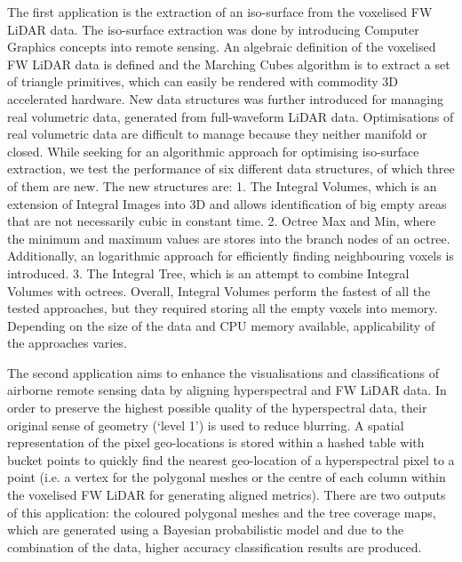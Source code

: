 \documentclass{subfiles}
\begin{document}
\par The first application is the extraction of an iso-surface from the voxelised FW LiDAR data. The iso-surface extraction was done by introducing Computer Graphics concepts into remote sensing. An algebraic definition of the voxelised FW LiDAR data is defined and the Marching Cubes algorithm is to extract a set of triangle primitives, which can easily be rendered with commodity 3D accelerated hardware. New data structures was further introduced for managing real volumetric data, generated from full-waveform LiDAR data. Optimisations of real volumetric data are difficult to manage because they neither manifold or closed. While seeking for an algorithmic approach for optimising iso-surface extraction, we test the performance of six different data structures, of which three of them are new. The new structures are: 1. The Integral Volumes, which is an extension of Integral Images into 3D and allows identification of big empty areas that are not necessarily cubic in constant time. 2. Octree Max and Min, where the minimum and maximum values are stores into the branch nodes of an octree. Additionally, an logarithmic approach for efficiently finding neighbouring voxels is introduced. 3. The Integral Tree, which is an attempt to combine Integral Volumes with octrees. Overall, Integral Volumes perform the fastest of all the tested approaches, but they required storing all the empty voxels into memory. Depending on the size of the data and CPU memory available, applicability of the approaches varies. 

\par The second application aims to enhance the visualisations and classifications of airborne remote sensing data by aligning hyperspectral and FW LiDAR data.  In order to preserve the highest possible quality of the hyperspectral data, their original sense of geometry (`level 1') is used to reduce blurring. A spatial representation of the pixel geo-locations is stored within a hashed table with bucket points to quickly find the nearest geo-location of a hyperspectral pixel to a point (i.e. a vertex for the polygonal meshes or the centre of each column within the voxelised FW LiDAR for generating aligned metrics). There are two outputs of this application: the coloured polygonal meshes and the tree coverage maps, which are generated using a Bayesian probabilistic model and due to the combination of the data, higher accuracy classification results are produced. 
\end{document}
